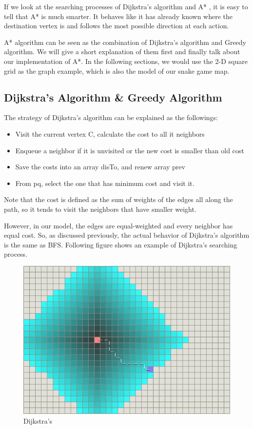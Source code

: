 \documentclass[12pt]{article}
\begin{document}
If we look at the searching processes of Dijkstra's algorithm and A* , it is easy to tell that A* is much smarter. It behaves like it has already known where the destination vertex is and follows the most possible direction at each action.

A* algorithm can be seen as the combination of Dijkstra's algorithm and Greedy algorithm. We will give a short explanation of them first and finally talk about our implementation of A*. In the following sections, we would use the 2-D square grid as the graph example, which is also the model of our snake game map.

\subsection{Dijkstra's Algorithm \& Greedy Algorithm}

The strategy of Dijkstra's algorithm can be explained as the followings:

\begin{itemize}
    \item Visit the current vertex C, calculate the cost to all it neighbors
    \item Enqueue a neighbor if it is unvisited or the new cost is smaller than old cost
    \item Save the costs into an array disTo, and renew array prev
    \item From pq, select the one that has minimum cost and visit it.
\end{itemize}

Note that the cost is defined as the sum of weights of the edges all along the path, so it tends to visit the neighbors that have smaller weight.

However, in our model, the edges are equal-weighted and every neighbor has equal cost. 
So, as discussed previously, the actual behavior of Dijkstra's algorithm is the same as BFS. 
Following figure shows an example of Dijkstra's searching process.

\begin{figure}[H]
    \centering 
    \includegraphics[scale = 0.4]{3.png}
    \caption{Dijkstra's}
\end{figure}
\end{document}
